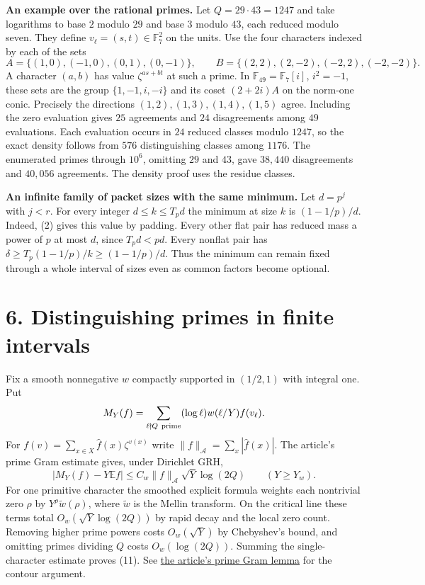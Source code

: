 \documentclass[11pt,letterpaper]{article}
\newcommand{\F}{\mathbb F}
\newcommand{\E}{\mathbb E}
\newcommand{\heading}[1]{\section*{\color{ink}#1}}
\newcommand{\subhead}[1]{\par\smallskip\noindent\textbf{#1.}\enspace}
\newcommand{\gh}[2]{\href{https://github.com/VladimirReshetnikov/ProveIt/blob/c0f2782360ddffd79a20c6d828d582e214a2b8c3/Analysis/GeneralizedRiemannHypothesis/#1}{#2}}
\begin{document}
\subhead{An example over the rational primes}
Let $Q=29\cdot43=1247$ and take logarithms to base $2$ modulo $29$ and base $3$ modulo $43$, each reduced modulo seven. They define $v_\ell=(s,t)\in\F_7^2$ on the units. Use the four characters indexed by each of the sets
\[
   A=\{(1,0),(-1,0),(0,1),(0,-1)\},\qquad
   B=\{(2,2),(2,-2),(-2,2),(-2,-2)\}.
\]
A character $(a,b)$ has value $\zeta^{as+bt}$ at such a prime. In $\F_{49}=\F_7[i]$, $i^2=-1$, these sets are the group $\{1,-1,i,-i\}$ and its coset $(2+2i)A$ on the norm-one conic. Precisely the directions $(1,2),(1,3),(1,4),(1,5)$ agree. Including the zero evaluation gives $25$ agreements and $24$ disagreements among $49$ evaluations. Each evaluation occurs in $24$ reduced classes modulo $1247$, so the exact density follows from $576$ distinguishing classes among $1176$. The enumerated primes through $10^6$, omitting $29$ and $43$, gave $38{,}440$ disagreements and $40{,}056$ agreements. The density proof uses the residue classes.

\subhead{An infinite family of packet sizes with the same minimum}
Let $d=p^j$ with $j<r$. For every integer $d\le k\le T_p d$ the minimum at size $k$ is $(1-1/p)/d$. Indeed, (2) gives this value by padding. Every other flat pair has reduced mass a power of $p$ at most $d$, since $T_pd<pd$. Every nonflat pair has $\delta\ge T_p(1-1/p)/k\ge(1-1/p)/d$. Thus the minimum can remain fixed through a whole interval of sizes even as common factors become optional.

\newpage
\heading{6. Distinguishing primes in finite intervals}
Fix a smooth nonnegative $w$ compactly supported in $(1/2,1)$ with integral one. Put
\[
   M_Y(f)=\sum_{\ell\nmid Q\ {\rm prime}} (\log\ell) w(\ell/Y)f(v_\ell).
\]
For $f(v)=\sum_{x\in X}\widehat f(x)\zeta^{v(x)}$ write $\|f\|_{\mathcal A}=\sum_x|\widehat f(x)|$. The article's prime Gram estimate gives, under Dirichlet GRH,
\[
   \left|M_Y(f)-Y\E f\right|\le C_w\|f\|_{\mathcal A}\sqrt{Y}\log(2Q)
                \qquad (Y\ge Y_w).                                  \tag{11}
\]
For one primitive character the smoothed explicit formula weights each nontrivial zero $\rho$ by $Y^\rho\widetilde w(\rho)$, where $\widetilde w$ is the Mellin transform. On the critical line these terms total $O_w(\sqrt{Y}\log(2Q))$ by rapid decay and the local zero count. Removing higher prime powers costs $O_w(\sqrt{Y})$ by Chebyshev's bound, and omitting primes dividing $Q$ costs $O_w(\log(2Q))$. Summing the single-character estimate proves (11). See \gh{Article/sections/rec.tex}{the article's prime Gram lemma} for the contour argument.
\end{document}
